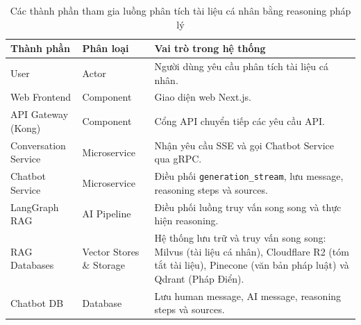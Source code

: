 \begin{table}[H]
\centering
\renewcommand{\arraystretch}{1.3}

\begin{tabular}{|l|l|p{5cm}|}
\hline
\textbf{Thành phần} & \textbf{Phân loại} & \textbf{Vai trò trong hệ thống} \\ \hline
User & Actor & Người dùng yêu cầu phân tích tài liệu cá nhân. \\ \hline
Web Frontend & Component & Giao diện web Next.js. \\ \hline
API Gateway (Kong) & Component & Cổng API chuyển tiếp các yêu cầu API. \\ \hline
Conversation Service & Microservice & Nhận yêu cầu SSE và gọi Chatbot Service qua gRPC. \\ \hline
Chatbot Service & Microservice & Điều phối \texttt{generation\_stream}, lưu message, reasoning steps và sources. \\ \hline
LangGraph RAG & AI Pipeline & Điều phối luồng truy vấn song song và thực hiện reasoning. \\ \hline
RAG Databases & Vector Stores \& Storage & Hệ thống lưu trữ và truy vấn song song: Milvus (tài liệu cá nhân), Cloudflare R2 (tóm tắt tài liệu), Pinecone (văn bản pháp luật) và Qdrant (Pháp Điển). \\ \hline
Chatbot DB & Database & Lưu human message, AI message, reasoning steps và sources. \\ \hline
\end{tabular}
\caption{Các thành phần tham gia luồng phân tích tài liệu cá nhân bằng reasoning pháp lý}
\end{table}
